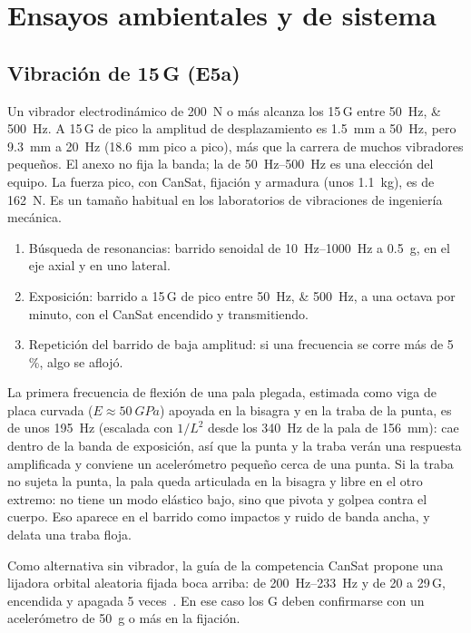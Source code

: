 \section{Ensayos ambientales y de sistema}\label{sec:ensayos-amb}

\subsection{Vibración de 15\,G (E5a)}
Un vibrador electrodinámico de \SI{200}{N} o más alcanza los 15\,G entre \SIlist{50;500}{Hz}.
A 15\,G de pico la amplitud de desplazamiento es \SI{1.5}{mm} a \SI{50}{Hz}, pero
\SI{9.3}{mm} a \SI{20}{Hz} (\SI{18.6}{mm} pico a pico), más que la carrera de muchos
vibradores pequeños. El anexo no fija la banda; la de \SIrange{50}{500}{Hz} es una
elección del equipo. La fuerza
pico, con CanSat, fijación y armadura (unos \SI{1.1}{kg}), es de \SI{162}{N}. Es un
tamaño habitual en los laboratorios de vibraciones de ingeniería mecánica.
\begin{enumerate}
  \item Búsqueda de resonancias: barrido senoidal de \SIrange{10}{1000}{Hz} a
        \SI{0.5}{g}, en el eje axial y en uno lateral.
  \item Exposición: barrido a 15\,G de pico entre \SIlist{50;500}{Hz}, a una octava por
        minuto, con el CanSat encendido y transmitiendo.
  \item Repetición del barrido de baja amplitud: si una frecuencia se corre más de 5\,\%,
        algo se aflojó.
\end{enumerate}
La primera frecuencia de flexión de una pala plegada, estimada como viga de placa curvada
($E\approx\SI{50}{GPa}$) apoyada en la bisagra y en la traba de la punta, es de unos
\SI{195}{Hz} (escalada con $1/L^2$ desde los \SI{340}{Hz} de la pala de \SI{156}{mm}): cae dentro de la banda de exposición, así que la punta y la traba verán
una respuesta amplificada y conviene un acelerómetro pequeño cerca de una punta. Si la
traba no sujeta la punta, la pala queda articulada en la bisagra y libre en el otro
extremo: no tiene un modo elástico bajo, sino que pivota y golpea contra el cuerpo. Eso
aparece en el barrido como impactos y ruido de banda ancha, y delata una traba floja.

Como alternativa sin vibrador, la guía de la competencia CanSat propone una lijadora
orbital aleatoria fijada boca arriba: de \SIrange{200}{233}{Hz} y de 20 a 29\,G,
encendida y apagada 5 veces~\cite{ensayos-cansatenv}. En ese caso los G deben
confirmarse con un acelerómetro de \SI{50}{g} o más en la fijación.

